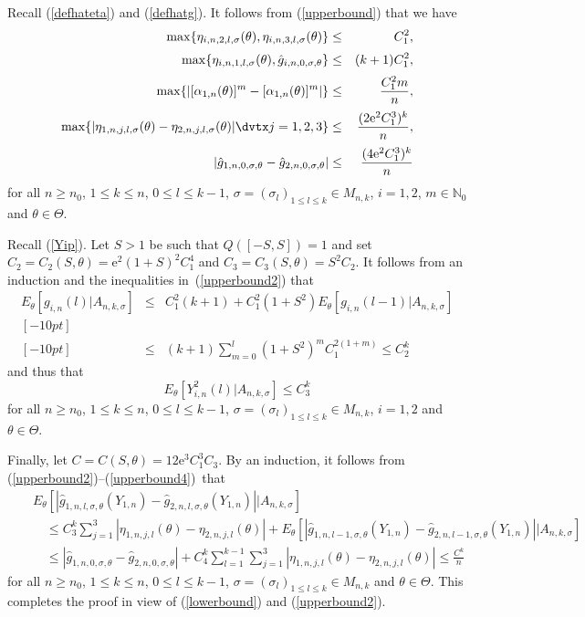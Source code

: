 \documentclass[number,citesort,seceqn,dvips]{arxbj}
\newcommand{\eqref}[1]{(\ref{#1})}
\newcommand{\NN}{\mathbb{N}}
\begin{document}
\begin{pf}
Recall \eqref{defhateta} and \eqref{defhatg}. It follows from
\eqref{upperbound} that we have
%
\begin{eqnarray}\label{upperbound2}
\max \{\eta_{i,n,2,l,\sigma}(\theta) ,
\eta_{i,n,3,l,\sigma}(\theta) \}&\le& C_1^2 ,\nonumber\\[2pt]
\max \{\eta_{i,n,1,l,\sigma}(\theta) ,  \hat
g_{i,n,0,\sigma,\theta} \}&\le& (k + 1) C_1^2 ,\nonumber\\[2pt]
\max \{|[\alpha_{1,n}(\theta)]^m-[\alpha
_{1,n}(\theta)]^m| \}&\le&
\frac{C_1^2m} n ,\\[2pt]
\max \{|\eta_{1,n,j,l,\sigma}(\theta)-\eta
_{2,n,j,l,\sigma}(\theta)| \dvtx j=1,2,3 \}&\le&
\frac{(2\mathrm{e}^2 C_1^3)^k}n ,\nonumber\\[2pt]
|\hat g_{1,n,0,\sigma,\theta}-\hat
g_{2,n,0,\sigma,\theta}|&\le&\frac{(4 \mathrm{e}^2 C_1^3)^k}n\nonumber
\end{eqnarray}
%
for all $n\ge n_0$, $1 \le  k \le  n$, $0 \le  l\le  k - 1$,
$\sigma=(\sigma_l)_{1\le l\le k}\in M_{n,k}$, $i=1,2$, $m\in\NN_0$ and
$\theta\in\Theta$.

Recall \eqref{Yip}. Let $S>1$ be such that $Q([-S,S])=1$ and set
$C_2=C_2(S,\theta)=\mathrm{e}^2(1+S)^2C_1^4$ and $C_3=C_3(S,\theta)=S^2C_2$. It
follows from an induction and the inequalities in~\eqref{upperbound2}
that
%
\begin{eqnarray}\label{upperbound3}
E_\theta[g_{i,n}(l)|A_{n,k,\sigma}]
&\le&C_1^2(k + 1) + C_1^2(1 + S^2)E_\theta[g_{i,n}(l -
1)|A_{n,k,\sigma}]\nonumber \\ [-10pt]\\ [-10pt]
 &\le&(k + 1)\sum_{m=0}^l
(1 + S^2)^m C_1^{2(1+m)}\le C_2^k\nonumber
\end{eqnarray}
%
and thus that
%
\begin{equation}\label{upperbound4}
E_\theta[Y^2_{i,n}(l)|A_{n,k,\sigma}] \le
C_3^k
\end{equation}
%
for all $n\ge n_0$, $1 \le  k \le  n$, $0 \le  l \le  k - 1$,
$\sigma=(\sigma_l)_{1\le l\le k}\in M_{n,k}$, $i=1,2$ and
$\theta\in\Theta$.

Finally, let $C=C(S,\theta)=12 \mathrm{e}^3 C_1^3C_3$. By an induction, it
follows from \eqref{upperbound2}--\eqref{upperbound4}~that
%
\begin{eqnarray*}
&&E_\theta [  |\hat
g_{1,n,l,\sigma,\theta}(Y_{1,n})-
\hat g_{2,n,l,\sigma,\theta}(Y_{1,n}) | |A_{n,k,\sigma} ] \\[-2pt]
&&\quad\le C^k_3\sum_{j=1}^3|\eta_{1,n,j,l}(\theta)-\eta
_{2,n,j,l}(\theta)|
+ E_\theta [  |\hat g_{1,n,l - 1,\sigma,\theta}(Y_{1,n})-
\hat
g_{2,n,l - 1,\sigma,\theta}(Y_{1,n}) | |A_{n,k,\sigma} ]\\[-2pt]
&&\quad\le |\hat g_{1,n,0,\sigma,\theta}- \hat
g_{2,n,0,\sigma,\theta} |+C^k_4\sum_{l=1}^{k-1}\sum
_{j=1}^3|\eta_{1,n,j,l}(\theta)-\eta_{2,n,j,l}(\theta)| \le
\frac{C^k}n
\end{eqnarray*}
%
for all $n\ge n_0$, $1 \le  k \le  n$, $0 \le  l \le  k - 1$,
$\sigma=(\sigma_l)_{1\le l\le k}\in M_{n,k}$ and $\theta\in\Theta$.
This completes the proof in view of \eqref{lowerbound} and
\eqref{upperbound2}.
\end{pf}
\end{document}
